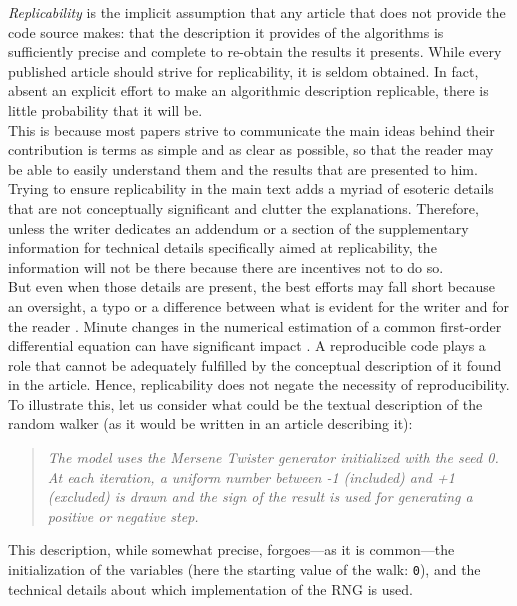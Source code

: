 \documentclass[a4paper,11pt]{article}
\begin{document}
\emph{Replicability} is the implicit
assumption that any article that does not provide the code source makes: that
the description it provides of the algorithms is sufficiently precise and
complete to re-obtain the results it presents. While every published article
should strive for replicability, it is seldom obtained. In fact, absent an explicit effort to make an algorithmic description replicable, there is little probability that it will be.\\

This is because most papers strive to communicate the main ideas behind their contribution is terms as simple and as clear as possible, so that the reader may be able to easily understand them and the results that are presented to him. Trying to ensure replicability in the main text adds a myriad of esoteric details that are not conceptually significant and clutter the explanations. Therefore, unless the writer dedicates an addendum or a section of the supplementary information for technical details specifically aimed at replicability, the information will not be there because there are incentives not to do so.\\

But even when those details are present, the best efforts may fall short because an oversight, a typo or a difference between what is evident for the writer and for the reader \citep{Mesnard:2016}. Minute changes in the numerical estimation of a common first-order differential equation can have significant impact \citep{Crook:2013}. A reproducible code plays a role that cannot be adequately fulfilled by the conceptual description of it found in the article. Hence, replicability does not negate the necessity of reproducibility. To illustrate this, let us consider what could be the textual description of the random walker (as it would be written in an article describing it):
%
\begin{quotation}
{\em The model uses the Mersene Twister generator initialized with the seed 0. At each iteration, a uniform number between -1 (included) and +1 (excluded) is drawn and the sign of the result is used for generating a positive or negative step.}
\end{quotation}
%
This description, while somewhat precise, forgoes---as it is common---the initialization of the variables (here the starting value of the walk: {\tt 0}), and the technical details about which implementation of the RNG is used.\\
\end{document}
